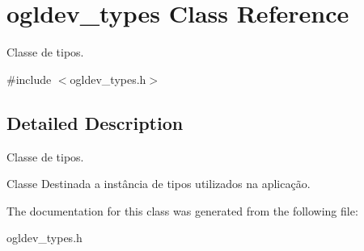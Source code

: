 \hypertarget{classogldev__types}{\section{ogldev\-\_\-types Class Reference}
\label{classogldev__types}
}


Classe de tipos.  




{\ttfamily \#include $<$ogldev\-\_\-types.\-h$>$}



\subsection{Detailed Description}
Classe de tipos. 

Classe Destinada a instância de tipos utilizados na aplicação. 

The documentation for this class was generated from the following file\-:\begin{DoxyCompactItemize}
\item 
ogldev\-\_\-types.\-h\end{DoxyCompactItemize}
